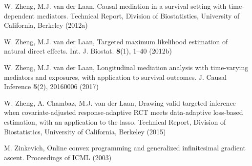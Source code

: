 \begin{list}{}{\setlength{\leftmargin}{2.1em}\setlength{\labelwidth}{0pt}
  \setlength{\labelsep}{0pt}\setlength{\itemindent}{-2.1em}
  \setlength{\parsep}{0pt}\setlength{\itemsep}{2pt}\setlength{\topsep}{0pt}}
\item\label{refentry:REF488}W. Zheng, M.J. van der Laan, Causal mediation in a survival setting with time-dependent mediators. Technical Report, Division of Biostatistics, University of California, Berkeley (2012a)\label{refend:REF488}
\item\label{refentry:REF489}W. Zheng, M.J. van der Laan, Targeted maximum likelihood estimation of natural direct effects. Int. J. Biostat. \textbf{8}(1), 1--40 (2012b)\label{refend:REF489}
\item\label{refentry:REF490}W. Zheng, M.J. van der Laan, Longitudinal mediation analysis with time-varying mediators and exposures, with application to survival outcomes. J. Causal Inference \textbf{5}(2), 20160006 (2017)\label{refend:REF490}
\item\label{refentry:REF491}W. Zheng, A. Chambaz, M.J. van der Laan, Drawing valid targeted inference when covariate-adjusted response-adaptive RCT meets data-adaptive loss-based estimation, with an application to the lasso. Technical Report, Division of Biostatistics, University of California, Berkeley (2015)\label{refend:REF491}
\item\label{refentry:REF492}M. Zinkevich, Online convex programming and generalized infinitesimal gradient ascent. Proceedings of ICML (2003)\label{refend:REF492}
\end{list}
\par\endgroup
